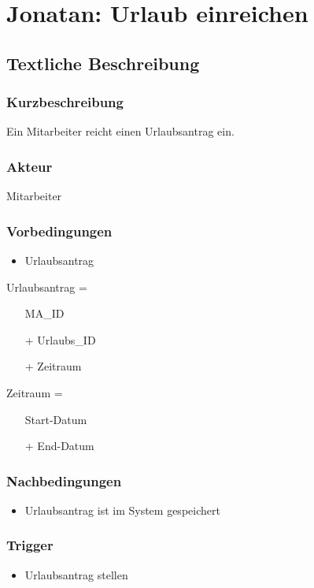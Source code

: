 \section{Jonatan: Urlaub einreichen}

\subsection{Textliche Beschreibung}

\subsubsection{Kurzbeschreibung}

Ein Mitarbeiter reicht einen Urlaubsantrag ein.

\subsubsection{Akteur}

Mitarbeiter

\subsubsection{Vorbedingungen}

\begin{itemize}
\item Urlaubsantrag
\end{itemize}

Urlaubsantrag =
\begin{itemize}
\item[] MA\_ID
\item[+] Urlaubs\_ID
\item[+] Zeitraum
\end{itemize}

Zeitraum = 
\begin{itemize}
\item[] Start-Datum
\item[+] End-Datum
\end{itemize}

\subsubsection{Nachbedingungen}
\begin{itemize}
\item Urlaubsantrag ist im System gespeichert
\end{itemize}

\subsubsection{Trigger}
\begin{itemize}
\item Urlaubsantrag stellen
\end{itemize}

